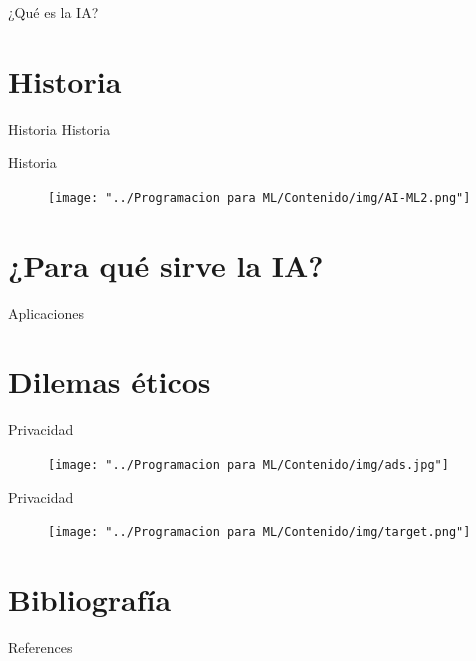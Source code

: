 \documentclass[11pt,aspectratio=169]{beamer}
\begin{document}
\begin{frame}{¿Qué es la IA?}

\end{frame}


\section{Historia}
\begin{frame}{Historia}
    Historia
\end{frame}

\begin{frame}{Historia}
    \begin{figure}
        \centering
        \texttt{[image: "../Programacion para ML/Contenido/img/AI-ML2.png"]}
    \end{figure}
\end{frame}

\section{¿Para qué sirve la IA?}
\begin{frame}{Aplicaciones}
    
\end{frame}

\section[Ética]{Dilemas éticos}
\begin{frame}{Privacidad}
    \begin{figure}
        \centering
        \texttt{[image: "../Programacion para ML/Contenido/img/ads.jpg"]}
    \end{figure}
\end{frame}

\begin{frame}{Privacidad}
    \begin{figure}
        \centering
        \texttt{[image: "../Programacion para ML/Contenido/img/target.png"]}
    \end{figure}
\end{frame}

\section*{Bibliografía}
\begin{frame}[allowframebreaks]{References}
    \nocite{*}
    
    
\end{frame}
\end{document}
